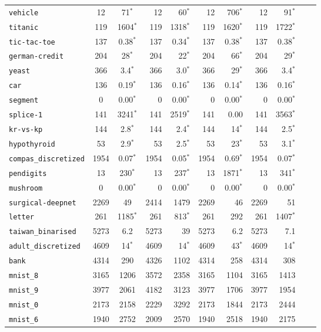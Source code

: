 \begin{tabular}{lccrrrrrrrr}
\texttt{vehicle} & 12 & 71$^*$ & 12 & 60$^*$ & 12 & 706$^*$ & 12 & 91$^*$\\
\texttt{titanic} & 119 & 1604$^*$ & 119 & 1318$^*$ & 119 & 1620$^*$ & 119 & 1722$^*$\\
\texttt{tic-tac-toe} & 137 & 0.38$^*$ & 137 & 0.34$^*$ & 137 & 0.38$^*$ & 137 & 0.38$^*$\\
\texttt{german-credit} & 204 & 28$^*$ & 204 & 22$^*$ & 204 & 66$^*$ & 204 & 29$^*$\\
\texttt{yeast} & 366 & 3.4$^*$ & 366 & 3.0$^*$ & 366 & 29$^*$ & 366 & 3.4$^*$\\
\texttt{car} & 136 & 0.19$^*$ & 136 & 0.16$^*$ & 136 & 0.14$^*$ & 136 & 0.16$^*$\\
\texttt{segment} & 0 & 0.00$^*$ & 0 & 0.00$^*$ & 0 & 0.00$^*$ & 0 & 0.00$^*$\\
\texttt{splice-1} & 141 & 3241$^*$ & 141 & 2519$^*$ & 141 & 0.00 & 141 & 3563$^*$\\
\texttt{kr-vs-kp} & 144 & 2.8$^*$ & 144 & 2.4$^*$ & 144 & 14$^*$ & 144 & 2.5$^*$\\
\texttt{hypothyroid} & 53 & 2.9$^*$ & 53 & 2.5$^*$ & 53 & 23$^*$ & 53 & 3.1$^*$\\
\texttt{compas\_discretized} & 1954 & 0.07$^*$ & 1954 & 0.05$^*$ & 1954 & 0.69$^*$ & 1954 & 0.07$^*$\\
\texttt{pendigits} & 13 & 230$^*$ & 13 & 237$^*$ & 13 & 1871$^*$ & 13 & 341$^*$\\
\texttt{mushroom} & 0 & 0.00$^*$ & 0 & 0.00$^*$ & 0 & 0.00$^*$ & 0 & 0.00$^*$\\
\texttt{surgical-deepnet} & 2269 & 49 & 2414 & 1479 & 2269 & 46 & 2269 & 51\\
\texttt{letter} & 261 & 1185$^*$ & 261 & 813$^*$ & 261 & 292 & 261 & 1407$^*$\\
\texttt{taiwan\_binarised} & 5273 & 6.2 & 5273 & 39 & 5273 & 6.2 & 5273 & 7.1\\
\texttt{adult\_discretized} & 4609 & 14$^*$ & 4609 & 14$^*$ & 4609 & 43$^*$ & 4609 & 14$^*$\\
\texttt{bank} & 4314 & 290 & 4326 & 1102 & 4314 & 258 & 4314 & 308\\
\texttt{mnist\_8} & 3165 & 1206 & 3572 & 2358 & 3165 & 1104 & 3165 & 1413\\
\texttt{mnist\_9} & 3977 & 2061 & 4182 & 3123 & 3977 & 1706 & 3977 & 1954\\
\texttt{mnist\_0} & 2173 & 2158 & 2229 & 3292 & 2173 & 1844 & 2173 & 2444\\
\texttt{mnist\_6} & 1940 & 2752 & 2009 & 2570 & 1940 & 2518 & 1940 & 2175\\

\end{tabular}
